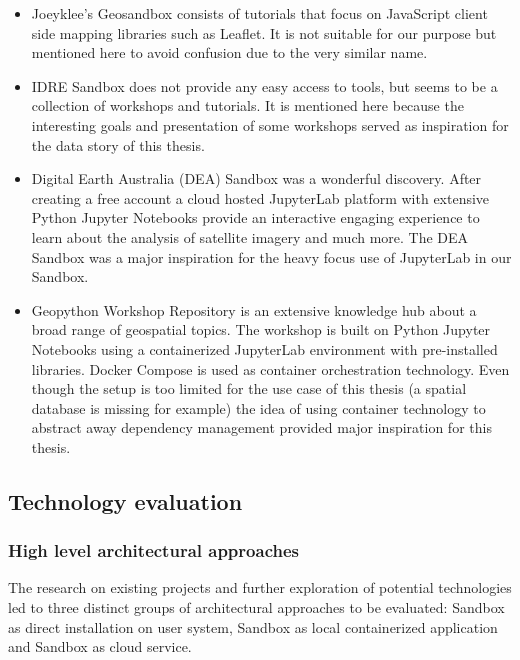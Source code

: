 \documentclass[11pt, a4paper, oneside, parskip=full-]{scrartcl}
\begin{document}
\begin{itemize}
  \item Joeyklee's Geosandbox\cite{project-joeyklee} consists of tutorials that
  focus on JavaScript client side mapping libraries such as Leaflet. It is not
  suitable for our purpose but mentioned here to avoid confusion due to the very
  similar name.
  \item IDRE Sandbox\cite{project-idre} does not provide any easy access to
  tools, but seems to be a collection of workshops and tutorials. It is
  mentioned here because the interesting goals and presentation of some
  workshops served as inspiration for the data story of this thesis.
  \item Digital Earth Australia (DEA) Sandbox\cite{project-dea} was a wonderful
  discovery. After creating a free account a cloud hosted
  JupyterLab\cite{jupyterlab} platform with extensive Python Jupyter Notebooks
  provide an interactive engaging experience to learn about the analysis of
  satellite imagery and much more. The DEA Sandbox was a major inspiration for
  the heavy focus use of JupyterLab in our Sandbox.
  \item Geopython Workshop Repository\cite{project-geopython} is an extensive
  knowledge hub about a broad range of geospatial topics. The workshop is built
  on Python Jupyter Notebooks using a containerized JupyterLab environment with
  pre-installed libraries. Docker Compose\cite{dockercompose} is used as
  container orchestration technology. Even though the setup is too limited for
  the use case of this thesis (a spatial database is missing for example) the
  idea of using container technology to abstract away dependency management
  provided major inspiration for this thesis.
\end{itemize}

\subsection{Technology evaluation}

\subsubsection{High level architectural approaches}
The research on existing projects and further exploration of potential
technologies led to three distinct groups of architectural approaches to be
evaluated: Sandbox as direct installation on user system, Sandbox as local
containerized application and Sandbox as cloud service.
\end{document}

